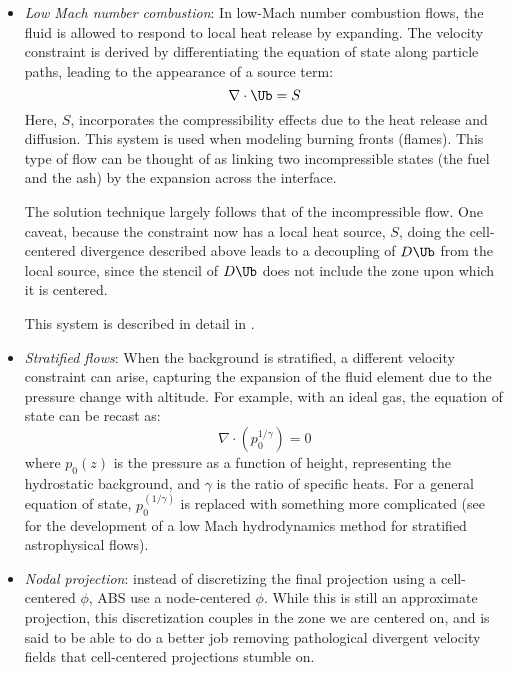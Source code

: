 \begin{itemize}
\item {\em Low Mach number combustion}: In low-Mach number combustion
  flows, the fluid is allowed to respond to local heat release
  by expanding.  The velocity constraint is derived by differentiating
  the equation of state along particle paths, leading to the appearance
  of a source term:
  \begin{equation}
  \nabla \cdot \Ub = S
  \end{equation}
  Here, $S$, incorporates the compressibility effects due to the
  heat release and diffusion.  This system is used when modeling
  burning fronts (flames).  This type of flow can be thought
  of as linking two incompressible states (the fuel and the ash)
  by the expansion across the interface.

  The solution technique largely follows that of the incompressible
  flow.  One caveat, because the constraint now has a local heat
  source, $S$, doing the cell-centered divergence described above
  leads to a decoupling of $D\Ub$ from the local source, since the
  stencil of $D\Ub$ does not include the zone upon which it is centered.

  This system is described in detail in \cite{pember-flame,
    DayBell:2000,SNpaper}.

\item {\em Stratified flows}: When the background is stratified, a
  different velocity constraint can arise, capturing the expansion of
  the fluid element due to the pressure change with altitude.  For example,
  with an ideal gas, the equation of state can be recast as:
  \begin{equation}
  \nabla \cdot (p_0^{1/\gamma}) = 0
  \end{equation}
  where $p_0(z)$ is the pressure as a function of height,
  representing the hydrostatic background, and $\gamma$ is the ratio
  of specific heats.  For a general equation of state,
  $p_0^(1/\gamma)$ is replaced with something more complicated (see
  \cite{ABRZ:I,ABRZ:II,ABNZ:III} for the development of a low Mach
  hydrodynamics method for stratified astrophysical flows).

\item {\em Nodal projection}: instead of discretizing the final projection
  using a cell-centered $\phi$, ABS use a node-centered $\phi$.  While
  this is still an approximate projection, this discretization couples
  in the zone we are centered on, and is said to be able to do a better
  job removing pathological divergent velocity fields that cell-centered
  projections stumble on.

\end{itemize}
